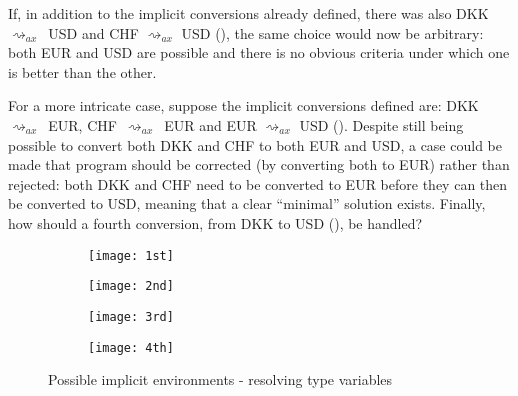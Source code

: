 If, in addition to the implicit conversions already defined, there was also DKK~$\rightsquigarrow_{ax}$~USD and CHF $\rightsquigarrow_{ax}$ USD (), the same choice would now be arbitrary: both EUR and USD are possible and there is no obvious criteria under which one is better than the other.

For a more intricate case, suppose the implicit conversions defined are: DKK~$\rightsquigarrow_{ax}$~EUR, CHF~$\rightsquigarrow_{ax}$~EUR and EUR $\rightsquigarrow_{ax}$ USD (). Despite still being possible to convert both DKK and CHF to both EUR and USD, a case could be made that program should be corrected (by converting both to EUR) rather than rejected: both DKK and CHF need to be converted to EUR before they can then be converted to USD, meaning that a clear ``minimal'' solution exists. Finally, how should a fourth conversion, from DKK to USD (), be handled?
\begin{figure}
  \centering
  \begin{subfigure}{.20\textwidth}
    \centering
    \texttt{[image: 1st]}
    \caption{}
    \label{1st}
  \end{subfigure}
  \begin{subfigure}{.20\textwidth}
    \centering
    \texttt{[image: 2nd]}
    \caption{}
    \label{2nd}
  \end{subfigure}
  \begin{subfigure}{.20\textwidth}
    \centering
    \texttt{[image: 3rd]}
    \caption{}
    \label{3rd}
  \end{subfigure}
  \begin{subfigure}{.20\textwidth}
    \centering
    \texttt{[image: 4th]}
    \caption{}
    \label{4th}
  \end{subfigure}  
  \caption{Possible implicit environments - resolving type variables}
\end{figure}

